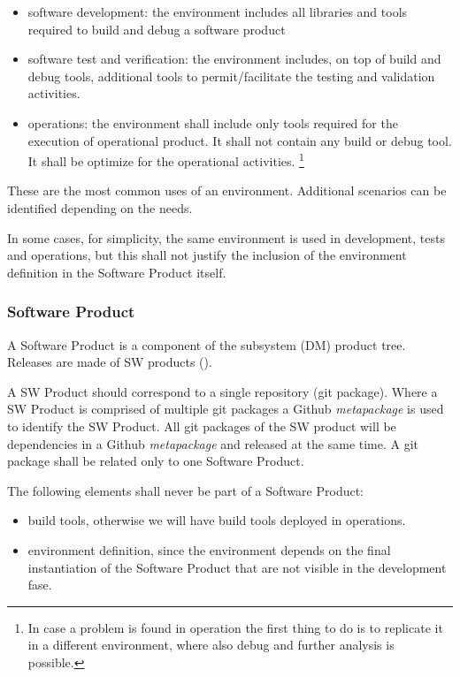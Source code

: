 \begin{itemize}
\item software development: the environment includes all libraries and tools required to build and debug a software product
\item software test and verification: the environment includes, on top of build and debug tools, additional tools to permit/facilitate the testing and validation activities.
\item operations: the environment shall include only tools required for the execution of operational product. It shall not contain any build or debug tool. It shall be optimize for the operational activities. \footnote{In case a problem is found in operation the first thing to do is to replicate it in a different environment, where also debug and further analysis is possible.}
\end{itemize}

These are the most common uses of an environment. Additional scenarios can be identified depending on the needs.

In some cases, for simplicity, the same environment is used in development, tests and operations, but this shall not justify the inclusion of the environment definition in the Software Product itself.


\subsubsection{Software Product} \label{sec:swdef}

A Software Product is a component of the subsystem (DM) product tree.
Releases are made of  SW products ().

A SW Product should correspond to a single repository (git package).
Where a SW Product is comprised of multiple git packages
a Github \textit{metapackage} is used to identify the SW Product.
All git packages of the SW product will be dependencies in a Github \textit{metapackage} and released at the same time.
A git package shall be related only to one Software Product.

The following elements shall never be part of a Software Product:

\begin{itemize}
\item build tools, otherwise we will have build tools deployed in operations.
\item environment definition, since the environment depends on the final instantiation of the Software Product that are not visible in the development fase.
\end{itemize}

